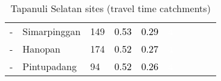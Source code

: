 \begin{table}[ht]
\begin{tabular}{C{0.05\textwidth}C{0.15\textwidth}C{0.08\textwidth}C{0.08\textwidth}C{0.08\textwidth}C{0.08\textwidth}C{0.08\textwidth}C{0.08\textwidth}C{0.08\textwidth}C{0.08\textwidth}}
  {-} & Simarpinggan & 149 & \textcolor[HTML]{000000}{0.53} & \textcolor[HTML]{000000}{0.29} & \textcolor[HTML]{FFFFFF}{4} &  &  &  &  \\ 
  {-} & Hanopan & 174 & \textcolor[HTML]{000000}{0.52} & \textcolor[HTML]{000000}{0.27} & \textcolor[HTML]{FFFFFF}{4} &  &  &  &  \\ 
  {-} & Pintupadang &  94 & \textcolor[HTML]{000000}{0.52} & \textcolor[HTML]{000000}{0.26} & \textcolor[HTML]{FFFFFF}{4} &  &  &  &  \\ 
  \end{tabular}
\endgroup
\caption{Tapanuli Selatan sites (travel time catchments)} 
\end{table}
